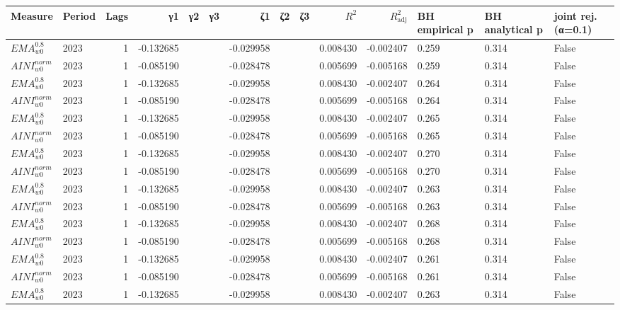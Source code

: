 \setlength\tabcolsep{2.0pt}
\scriptsize

\begin{tabular}{@{}llrrrrrrrrrlll@{}}
\toprule
Measure & Period & Lags & γ1 & γ2 & γ3 & ζ1 & ζ2 & ζ3 & $R^{2}$ & $R^{2}_{\mathrm{adj}}$ & BH empirical p & BH analytical p & joint rej. (α=0.1) \\
\midrule
$EMA^{0.8}_{w0}$ & 2023 & 1 & -0.132685 &  &  & -0.029958 &  &  & 0.008430 & -0.002407 & 0.259 & 0.314 & False \\
$AINI^{norm}_{w0}$ & 2023 & 1 & -0.085190 &  &  & -0.028478 &  &  & 0.005699 & -0.005168 & 0.259 & 0.314 & False \\
$EMA^{0.8}_{w0}$ & 2023 & 1 & -0.132685 &  &  & -0.029958 &  &  & 0.008430 & -0.002407 & 0.264 & 0.314 & False \\
$AINI^{norm}_{w0}$ & 2023 & 1 & -0.085190 &  &  & -0.028478 &  &  & 0.005699 & -0.005168 & 0.264 & 0.314 & False \\
$EMA^{0.8}_{w0}$ & 2023 & 1 & -0.132685 &  &  & -0.029958 &  &  & 0.008430 & -0.002407 & 0.265 & 0.314 & False \\
$AINI^{norm}_{w0}$ & 2023 & 1 & -0.085190 &  &  & -0.028478 &  &  & 0.005699 & -0.005168 & 0.265 & 0.314 & False \\
$EMA^{0.8}_{w0}$ & 2023 & 1 & -0.132685 &  &  & -0.029958 &  &  & 0.008430 & -0.002407 & 0.270 & 0.314 & False \\
$AINI^{norm}_{w0}$ & 2023 & 1 & -0.085190 &  &  & -0.028478 &  &  & 0.005699 & -0.005168 & 0.270 & 0.314 & False \\
$EMA^{0.8}_{w0}$ & 2023 & 1 & -0.132685 &  &  & -0.029958 &  &  & 0.008430 & -0.002407 & 0.263 & 0.314 & False \\
$AINI^{norm}_{w0}$ & 2023 & 1 & -0.085190 &  &  & -0.028478 &  &  & 0.005699 & -0.005168 & 0.263 & 0.314 & False \\
$EMA^{0.8}_{w0}$ & 2023 & 1 & -0.132685 &  &  & -0.029958 &  &  & 0.008430 & -0.002407 & 0.268 & 0.314 & False \\
$AINI^{norm}_{w0}$ & 2023 & 1 & -0.085190 &  &  & -0.028478 &  &  & 0.005699 & -0.005168 & 0.268 & 0.314 & False \\
$EMA^{0.8}_{w0}$ & 2023 & 1 & -0.132685 &  &  & -0.029958 &  &  & 0.008430 & -0.002407 & 0.261 & 0.314 & False \\
$AINI^{norm}_{w0}$ & 2023 & 1 & -0.085190 &  &  & -0.028478 &  &  & 0.005699 & -0.005168 & 0.261 & 0.314 & False \\
$EMA^{0.8}_{w0}$ & 2023 & 1 & -0.132685 &  &  & -0.029958 &  &  & 0.008430 & -0.002407 & 0.263 & 0.314 & False \\

\end{tabular}
